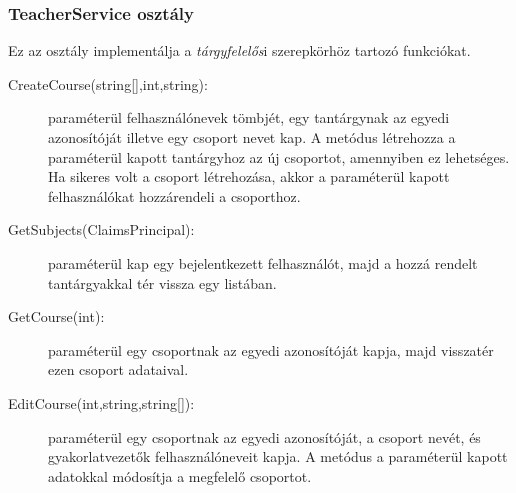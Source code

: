 \subsubsection{TeacherService osztály}
Ez az osztály implementálja a \emph{tárgyfelelős}i szerepkörhöz tartozó funkciókat.
\begin{description}
	\item[CreateCourse(string{[]},int,string):] paraméterül felhasználónevek tömbjét, egy tantárgynak az egyedi azonosítóját illetve egy csoport nevet kap. A metódus létrehozza a paraméterül kapott tantárgyhoz az új csoportot, amennyiben ez lehetséges. Ha sikeres volt a csoport létrehozása, akkor a paraméterül kapott felhasználókat hozzárendeli a csoporthoz.
	\item[GetSubjects(ClaimsPrincipal):] paraméterül kap egy bejelentkezett felhasználót, majd a hozzá rendelt tantárgyakkal tér vissza egy listában.
	\item[GetCourse(int):] paraméterül egy csoportnak az egyedi azonosítóját kapja, majd visszatér ezen csoport adataival.
	\item[EditCourse(int,string,string{[]}):] paraméterül egy csoportnak az egyedi azonosítóját, a csoport nevét, és gyakorlatvezetők felhasználóneveit kapja. A metódus a paraméterül kapott adatokkal módosítja a megfelelő csoportot. 
\end{description}
